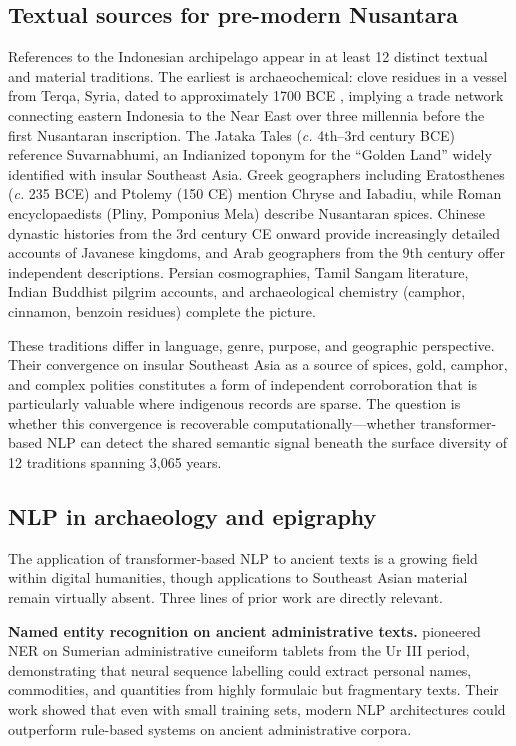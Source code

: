 \documentclass[12pt]{article}
\begin{document}
\subsection{Textual sources for pre-modern Nusantara}

References to the Indonesian archipelago appear in at least 12 distinct textual and material traditions.
The earliest is archaeochemical: clove residues in a vessel from Terqa, Syria, dated to approximately 1700 BCE \citep{Rageot2023}, implying a trade network connecting eastern Indonesia to the Near East over three millennia before the first Nusantaran inscription.
The Jataka Tales (\textit{c.} 4th--3rd century BCE) reference Suvarnabhumi, an Indianized toponym for the ``Golden Land'' widely identified with insular Southeast Asia.
Greek geographers including Eratosthenes (\textit{c.} 235 BCE) and Ptolemy (150 CE) mention Chryse and Iabadiu, while Roman encyclopaedists (Pliny, Pomponius Mela) describe Nusantaran spices.
Chinese dynastic histories from the 3rd century CE onward provide increasingly detailed accounts of Javanese kingdoms, and Arab geographers from the 9th century offer independent descriptions.
Persian cosmographies, Tamil Sangam literature, Indian Buddhist pilgrim accounts, and archaeological chemistry (camphor, cinnamon, benzoin residues) complete the picture.

These traditions differ in language, genre, purpose, and geographic perspective.
Their convergence on insular Southeast Asia as a source of spices, gold, camphor, and complex polities constitutes a form of independent corroboration that is particularly valuable where indigenous records are sparse.
The question is whether this convergence is recoverable computationally---whether transformer-based NLP can detect the shared semantic signal beneath the surface diversity of 12 traditions spanning 3,065 years.

\subsection{NLP in archaeology and epigraphy}

The application of transformer-based NLP to ancient texts is a growing field within digital humanities, though applications to Southeast Asian material remain virtually absent.
Three lines of prior work are directly relevant.

\textbf{Named entity recognition on ancient administrative texts.}
\citet{PagePerron2017} pioneered NER on Sumerian administrative cuneiform tablets from the Ur III period, demonstrating that neural sequence labelling could extract personal names, commodities, and quantities from highly formulaic but fragmentary texts.
Their work showed that even with small training sets, modern NLP architectures could outperform rule-based systems on ancient administrative corpora.
\end{document}
